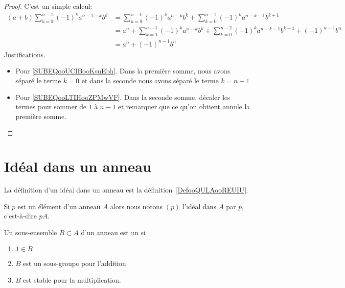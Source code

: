 \begin{proof}
    C'est un simple calcul:
    \begin{subequations}
        \begin{align}
            (a+b)\sum_{k=0}^{n-1}(-1)^ka^{n-1-k}b^k&=\sum_{k=0}^{n-1}(-1)^ka^{n-k}b^k+\sum_{k=0}^{n-1}(-1)^ka^{n-k-1}b^{k+1}\\
            &= a^n+\sum_{k=1}^{n-1}(-1)^ka^{n-k}b^k+\sum_{k=0}^{n-2}(-1)^ka^{n-k-1}b^{k+1} +(-1)^{n-1}b^n    \label{SUBEQooUCIBooKsuEbh}\\
            &=a^n+(-1)^{n-1}b^n     \label{SUBEQooLTIHooZPMwVF}
        \end{align}
    \end{subequations}
    Justifications.
    \begin{itemize}
        \item Pour \eqref{SUBEQooUCIBooKsuEbh}. Dans la première somme, nous avons séparé le terme \( k=0\) et dans la seconde nous avons séparé le terme \( k=n-1\)
        \item Pour \eqref{SUBEQooLTIHooZPMwVF}. Dans la seconde somme, décaler les termes pour sommer de \( 1\) à \( n-1\) et remarquer que ce qu'on obtient annule la première somme.
    \end{itemize}
\end{proof}

\section{Idéal dans un anneau}

La définition d'un idéal dans un anneau est la définition~\ref{DefooQULAooREUIU}.


\begin{definition}  \label{DefSKTooOTauAR}
    Si \( p\) est un élément d'un anneau \( A\) alors nous notons \( (p)\) l'idéal dans \( A\)  par \( p\), c'est-à-dire \( pA\).
\end{definition}

\begin{definition}  \label{DefAJVTPxb}
    Un sous-ensemble \( B\subset A\) d'un anneau est un  si
    \begin{enumerate}
        \item
            \( 1\in B\)
        \item
            \( B\) est un sous-groupe pour l'addition
        \item
            \( B\) est stable pour la multiplication.
    \end{enumerate}
\end{definition}

